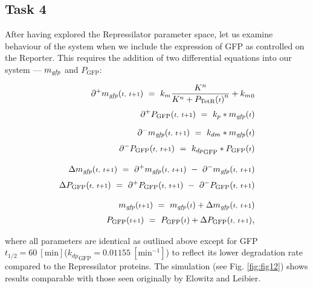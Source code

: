 \documentclass[runningheads,a4paper]{llncs}
\begin{document}
\clearpage
\subsection*{Task 4}
After having explored the Repressilator parameter space, let us examine behaviour of the system when we include the expression of GFP as controlled on the Reporter. This requires the addition of two differential equations into our system --- $m_{\textrm{\textit{gfp}}}$ and $P_{\textrm{GFP}}$:

\begin{equation*}
    \begin{aligned}
        \partial^{+}m_{\textrm{\textit{gfp}}}({\scriptstyle t,\ t+1})\ =\ k_{m}\frac{K^{n}}{K^{n}+{P_{\textrm{TetR}}({\scriptstyle t})}^{n}}+{k_{m}}_{0} \\[0.1cm]
        \partial^{+}P_{\textrm{GFP}}({\scriptstyle t,\ t+1})\ =\ k_{p}*{m_{\textrm{\textit{gfp}}}({\scriptstyle t})} \\[0.2cm]
        \partial^{-}m_{\textrm{\textit{gfp}}}({\scriptstyle t,\ t+1})\ =\ k_{dm}*{m_{\textrm{\textit{gfp}}}({\scriptstyle t})} \\[0.1cm]
        \partial^{-}P_{\textrm{GFP}}({\scriptstyle t,\ t+1})\ =\ {k_{dp}}_{\textrm{GFP}}*{P_{\textrm{GFP}}({\scriptstyle t})} \\[0.3cm]
        \Delta m_{\textrm{\textit{gfp}}}({\scriptstyle t,\ t+1})\ =\ \partial^{+}m_{\textrm{\textit{gfp}}}({\scriptstyle t,\ t+1})\ -\ \partial^{-}m_{\textrm{\textit{gfp}}}({\scriptstyle t,\ t+1}) \\[0.1cm]
        \Delta P_{\textrm{GFP}}({\scriptstyle t,\ t+1})\ =\ \partial^{+}P_{\textrm{GFP}}({\scriptstyle t,\ t+1})\ -\ \partial^{-}P_{\textrm{GFP}}({\scriptstyle t,\ t+1}) \\[0.3cm]
        m_{\textrm{\textit{gfp}}}({\scriptstyle t+1})\ =\ m_{\textrm{\textit{gfp}}}({\scriptstyle t}) + \Delta m_{\textrm{\textit{gfp}}}({\scriptstyle t,\ t+1}) \\[0.1cm]
        P_{\textrm{GFP}}({\scriptstyle t+1})\ =\ P_{\textrm{GFP}}({\scriptstyle t}) + \Delta P_{\textrm{GFP}}({\scriptstyle t,\ t+1})\textrm{\large{,}}
    \end{aligned}
\end{equation*}

\noindent where all parameters are identical as outlined above except for GFP $t_{1/2} = 60\ [\textrm{min}]$\linebreak (${k_{dp}}_{\textrm{GFP}} = 0.01155\ [\textrm{min}^{-1}]$) to reflect its lower degradation rate compared to the Repressilator proteins. The simulation (see Fig. \ref{fig:fig12}) shows results comparable with those seen originally by Elowitz and Leibier\cite{Elowitz2000d}.
\end{document}
